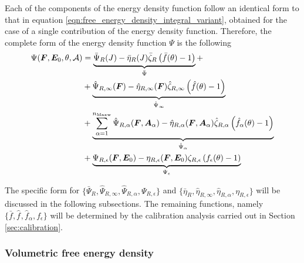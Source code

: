 Each of the components of the energy density function follow an identical form to that in equation \eqref{eqn:free_energy_density_integral_variant}, obtained for the case of a single contribution of the energy density function. Therefore, the complete form of the energy density function $\Psi$ is the following
%
\begin{equation}\label{eqn:full_free_energy_density_model}
\begin{aligned}
		\Psi(\F,\E_0,\theta,\A) &=
	\underbrace{%
		\bar\Psi_{R}(J) - \bar\eta_{R}(J) \bar\zeta_{R} \left(\bar f(\theta)-1\right)
	}_{\bar\Psi} + \\ 
	&+
		\underbrace{%
		\hat\Psi_{R,\infty}(\vect{F}) - \hat\eta_{R,\infty}(\vect{F}) \hat\zeta_{R,\infty} \left(\hat f(\theta)-1\right) %
	}_{\hat\Psi_{\infty}}\\
	&+	\underbrace{%
		\sum_{\alpha=1}^{n_{\text{Maxw}}}\hat\Psi_{R,\alpha}(\vect{F},\vect{A}_{\alpha}) - \hat\eta_{R,\alpha}(\vect{F},\vect{A}_{\alpha}) \hat\zeta_{R,\alpha} \left(\hat f_{\alpha}(\theta)-1\right) %
	}_{\hat\Psi_{\alpha}}\\
	 &+	\underbrace{%
	 	\Psi_{R,\epsilon}(\vect{F},\vect{E}_0) - \eta_{R,\epsilon}(\vect{F},\vect{E}_0) \zeta_{R,\epsilon} \left( f_\epsilon(\theta)-1\right) %
	 }_{\Psi_{\epsilon}}
	\end{aligned}
\end{equation}

The specific form for $\{\bar\Psi_R,\hat\Psi_{R,\infty},\hat\Psi_{R,\alpha},\Psi_{R,\epsilon}\}$ and $\{\bar\eta_{R},\hat\eta_{R,\infty},\hat\eta_{R,\alpha},\eta_{R,\epsilon}\}$ will be discussed in the following subsections. The remaining functions, namely $\{\bar f,\hat f_{},\hat f_{\alpha},f_{\epsilon}\}$ will be determined by the calibration analysis carried out in Section \ref{sec:calibration}.


%



\subsubsection{Volumetric free energy density} \label{sec:volumetric_model}

